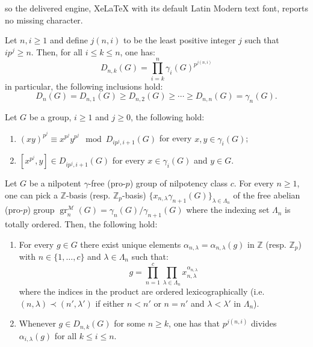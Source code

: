 \documentclass[10pt,a4paper]{amsart}
\newcommand{\Z}{\mathbb Z}
\newcommand{\grM}{\operatorname{gr}^{\mathscr M}}
\begin{document}
so the delivered engine, XeLaTeX with its default Latin Modern text font, reports no missing character.
\begin{remark}\label{rem:explicit.filtration}
    Let $n, i \geq 1$ and define $j(n, i)$ to be the least positive integer $j$ such that $ip^{j} \geq n$. Then, for all $i \leq k \leq n$, one has:
    \begin{equation}                        D_{n, k}(G) = \prod_{i=k}^n \gamma_i(G)^{p^{j(n, i)}} %
    \end{equation}
    in particular, the following inclusions hold:
    \[
        D_n(G) = D_{n, 1}(G) \geq D_{n, 2}(G) \geq \cdots \geq D_{n, n}(G) = \gamma_n(G).
    \] 
\end{remark}

\begin{prop}\label{prop:hall}
    Let $G$ be a group, $i \geq 1$ and $j \geq 0$, the following hold:
    \begin{enumerate}
        \item $(xy)^{p^j} \equiv x^{p^j} y^{p^j} \mod D_{ip^j, i+1}(G)$ for every $x, y \in \gamma_i(G)$;
        \item $[x^{p^j}, y] \in D_{ip^j, i+1}(G)$ for every $x \in \gamma_i(G)$ and $y \in G$.
    \end{enumerate}
\end{prop}

\begin{prop}\label{prop:basis}
    Let $G$ be a nilpotent $\gamma$-free (pro-$p$) group of nilpotency class $c$. For every $n \geq 1$, one can pick a $\Z$-basis (resp. $\Z_p$-basis) $\{x_{n, \lambda} \gamma_{n+1}(G)\}_{\lambda \in \Lambda_n}$ of the free abelian (pro-$p$) group $\grM_n(G) = \gamma_n(G)/\gamma_{n+1}(G)$ where the indexing set $\Lambda_n$ is totally ordered. Then, the following hold:

    \begin{enumerate}
        \item For every $g \in G$ there exist unique elements $\alpha_{n, \lambda} = \alpha_{n, \lambda}(g)$ in $\Z$ (resp. $\Z_p$) with $n \in \{1, \dots, c\}$ and $\lambda \in \Lambda_n$ such that: 
        \[
            g = \prod_{n = 1}^c \prod_{\lambda \in \Lambda_n} x_{n, \lambda}^{\alpha_{n, \lambda}}
        \]
        where the indices in the product are ordered lexicographically (i.e. $(n, \lambda) \prec (n', \lambda')$ if either $n < n'$ or $n = n'$ and $\lambda < \lambda'$ in $\Lambda_n$).

        \item Whenever $g \in D_{n,k}(G)$ for some $n \geq k$, one has that $p^{j(n, i)}$ divides $\alpha_{i, \lambda}(g)$ for all $k \leq i \leq n$.
    \end{enumerate}
\end{prop}
\end{document}
